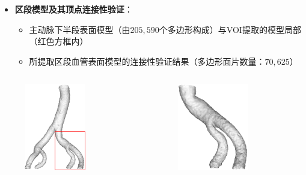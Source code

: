 % 

\begin{frame}
\begin{itemize}
  \item \textbf{区段模型及其顶点连接性验证}：
  \begin{itemize}
     \item 主动脉下半段表面模型（由$205,590$个多边形构成）与VOI提取的模型局部（红色方框内）
     \item 所提取区段血管表面模型的连接性验证结果（多边形面片数量：$70,625$）
  \end{itemize}
\end{itemize}
\begin{columns}[b,onlytextwidth]
\begin{column}{.5\textwidth}
 \begin{figure}[t]
\centering
\includegraphics[height=1.5in]{../../Figures/postprocessing/centerlines/VOI.eps}
\end{figure}
\end{column}
\begin{column}{.5\textwidth}
 \begin{figure}[t]
\centering
\includegraphics[height=1.5in]{../../Figures/postprocessing/centerlines/connectivity_local.eps}
\end{figure}
\end{column}
\end{columns}
\end{frame}

